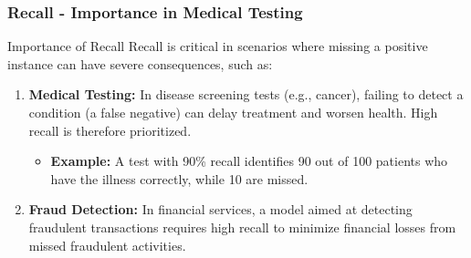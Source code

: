 \documentclass[aspectratio=169]{beamer}
\begin{document}
\begin{frame}[fragile]
    \frametitle{Recall - Importance in Medical Testing}
    \begin{block}{Importance of Recall}
        Recall is critical in scenarios where missing a positive instance can have severe consequences, such as:
    \end{block}
    
    \begin{enumerate}
        \item \textbf{Medical Testing:}
            In disease screening tests (e.g., cancer), failing to detect a condition (a false negative) can delay treatment and worsen health. High recall is therefore prioritized.
            \begin{itemize}
                \item \textbf{Example:} A test with 90\% recall identifies 90 out of 100 patients who have the illness correctly, while 10 are missed.
            \end{itemize}
        \item \textbf{Fraud Detection:}
            In financial services, a model aimed at detecting fraudulent transactions requires high recall to minimize financial losses from missed fraudulent activities.
    \end{enumerate}
\end{frame}
\end{document}
